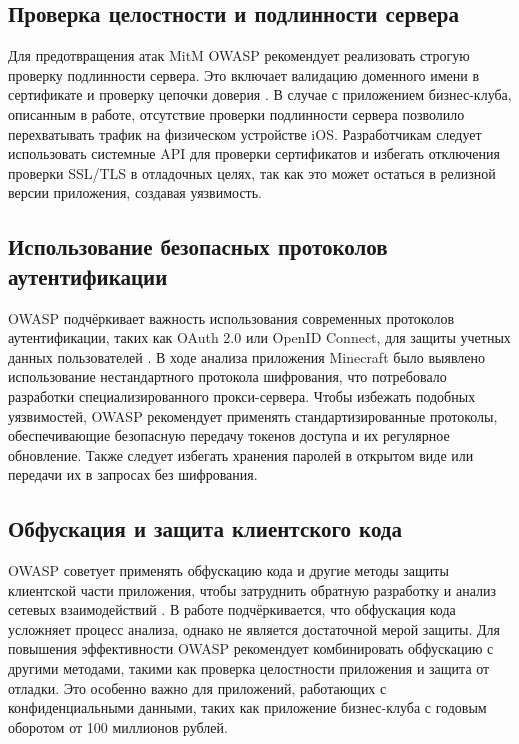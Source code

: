 \subsection{Проверка целостности и подлинности сервера}
Для предотвращения атак MitM OWASP рекомендует реализовать строгую проверку подлинности сервера. Это включает валидацию доменного имени в сертификате и проверку цепочки доверия \cite{owasp_mobile_security_testing_guide}. В случае с приложением бизнес-клуба, описанным в работе, отсутствие проверки подлинности сервера позволило перехватывать трафик на физическом устройстве iOS. Разработчикам следует использовать системные API для проверки сертификатов и избегать отключения проверки SSL/TLS в отладочных целях, так как это может остаться в релизной версии приложения, создавая уязвимость.

\subsection{Использование безопасных протоколов аутентификации}
OWASP подчёркивает важность использования современных протоколов аутентификации, таких как OAuth 2.0 или OpenID Connect, для защиты учетных данных пользователей \cite{owasp_mobile_top_10_2016}. В ходе анализа приложения Minecraft было выявлено использование нестандартного протокола шифрования, что потребовало разработки специализированного прокси-сервера. Чтобы избежать подобных уязвимостей, OWASP рекомендует применять стандартизированные протоколы, обеспечивающие безопасную передачу токенов доступа и их регулярное обновление. Также следует избегать хранения паролей в открытом виде или передачи их в запросах без шифрования.

\subsection{Обфускация и защита клиентского кода}
OWASP советует применять обфускацию кода и другие методы защиты клиентской части приложения, чтобы затруднить обратную разработку и анализ сетевых взаимодействий \cite{owasp_mobile_security_project}. В работе подчёркивается, что обфускация кода усложняет процесс анализа, однако не является достаточной мерой защиты. Для повышения эффективности OWASP рекомендует комбинировать обфускацию с другими методами, такими как проверка целостности приложения и защита от отладки. Это особенно важно для приложений, работающих с конфиденциальными данными, таких как приложение бизнес-клуба с годовым оборотом от 100 миллионов рублей.

